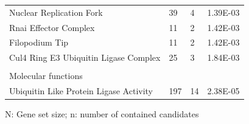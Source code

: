 \begin{refsection}
\begin{table}[H]
\begin{tabular}{@{}llll@{}}
Nuclear Replication Fork               & 39   & 4  & 1.39E-03         \\
Rnai Effector Complex                  & 11   & 2  & 1.42E-03         \\
Filopodium Tip                         & 11   & 2  & 1.42E-03         \\
Cul4 Ring E3 Ubiquitin Ligase Complex  & 25   & 3  & 1.84E-03         \\
                                       &      &    &                  \\
Molecular functions                    &      &    &                  \\
Ubiquitin Like Protein Ligase Activity & 197  & 14 & 2.38E-05         \\ \hline
\end{tabular}
N: Gene set size; n: number of contained candidates
\end{table}


\printbibliography[heading=subbibliography]
\end{refsection}

